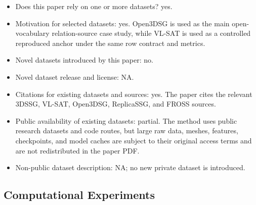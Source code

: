 \begin{itemize}
    \item Does this paper rely on one or more datasets? yes.
    \item Motivation for selected datasets: yes. Open3DSG is used as the main
    open-vocabulary relation-source case study, while VL-SAT is used as a
    controlled reproduced anchor under the same row contract and metrics.
    \item Novel datasets introduced by this paper: no.
    \item Novel dataset release and license: NA.
    \item Citations for existing datasets and sources: yes. The paper cites the
    relevant 3DSSG, VL-SAT, Open3DSG, ReplicaSSG, and FROSS sources.
    \item Public availability of existing datasets: partial. The method uses
    public research datasets and code routes, but large raw data, meshes,
    features, checkpoints, and model caches are subject to their original access
    terms and are not redistributed in the paper PDF.
    \item Non-public dataset description: NA; no new private dataset is
    introduced.
\end{itemize}

\subsection*{Computational Experiments}

